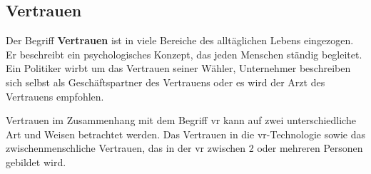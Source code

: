 \documentclass[a4paper,11pt]{article}%
\renewcommand{\\}{\vspace*{0.5\baselineskip} \newline}
\begin{document}

%




	





\newpage

	\subsection{Vertrauen}
	\label{Vertrauen}
Der Begriff \textbf{Vertrauen} ist in viele Bereiche des alltäglichen Lebens eingezogen. Er beschreibt ein psychologisches Konzept, das jeden Menschen ständig begleitet.
Ein Politiker wirbt um das Vertrauen seiner Wähler, Unternehmer beschreiben sich selbst als Geschäftspartner des Vertrauens oder es wird der \dq{}Arzt des Vertrauens\dq{} empfohlen.

Vertrauen im Zusammenhang mit dem Begriff \dq{}\ac{vr}\dq{} kann auf zwei unterschiedliche Art und Weisen betrachtet werden. Das Vertrauen in die \ac{vr}-Technologie sowie das zwischenmenschliche Vertrauen, das in der \ac{vr} zwischen 2 oder mehreren Personen gebildet wird.
\end{document}
